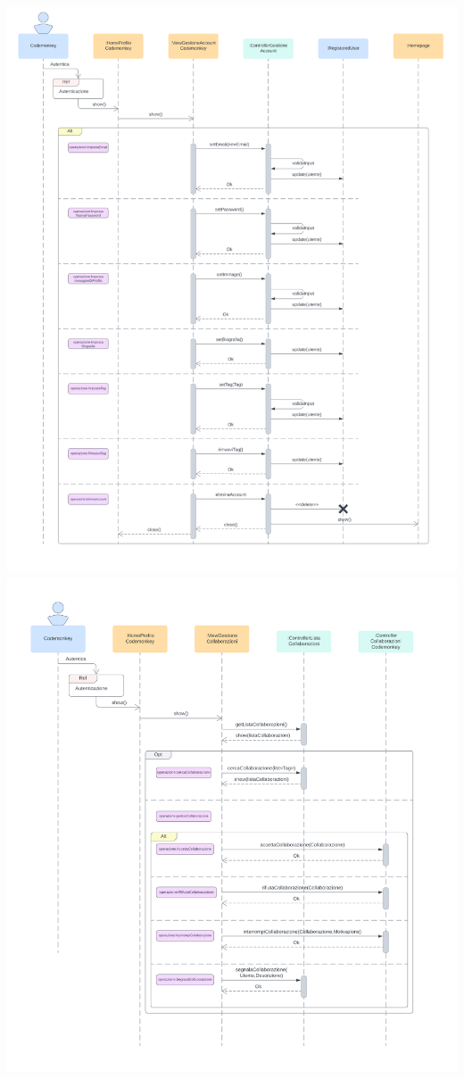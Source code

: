 \includegraphics[width=1\textwidth]{assets/img/sequenza/codemonkey-1.png}\\
\includegraphics[width=1\textwidth]{assets/img/sequenza/codemonkey-2.png}\\